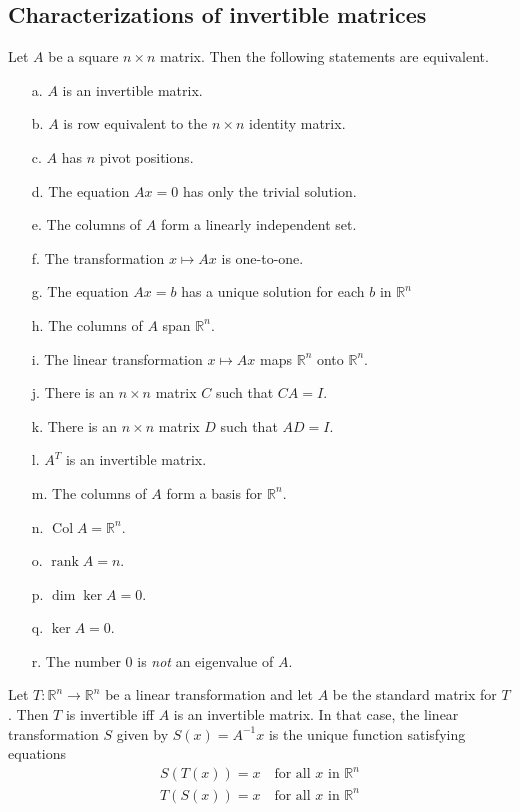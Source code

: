 \documentclass{article}
\DeclareMathOperator{\Col}{Col}
\DeclareMathOperator{\rank}{rank}
\begin{document}
\subsection{Characterizations of invertible matrices}

\begin{thm} 
    Let $A$ be a square $n\times n$ matrix. Then the following statements are equivalent.
    \begin{enumerate}
        \item[a.] $A$ is an invertible matrix.
        \item[b.] $A$ is row equivalent to the $n\times n$ identity matrix.
        \item[c.] $A$ has $n$ pivot positions.
        \item[d.] The equation $Ax=0$ has only the trivial solution.
        \item[e.] The columns of $A$ form a linearly independent set.
        \item[f.] The transformation $x \mapsto Ax$ is one-to-one.
        \item[g.] The equation $Ax=b$ has a unique solution for each $b$ in $\mathbb{R}^n$
        \item[h.] The columns of $A$ span $\mathbb{R}^n$.
        \item[i.] The linear transformation $x\mapsto Ax$ maps $\mathbb{R}^n$ onto $\mathbb{R}^n$.
        \item[j.] There is an $n\times n$ matrix $C$ such that $CA=I$.
        \item[k.] There is an $n\times n$ matrix $D$ such that $AD=I$.
        \item[l.] $A^T$ is an invertible matrix.
        \item[m.] The columns of \(A\) form a basis for \(\mathbb{R}^n\).
        \item[n.] \(\Col A=\mathbb{R}^n\).
        \item[o.] \(\rank A=n\).
        \item[p.] \(\dim \ker A=0\).
        \item[q.] \(\ker A=0\).
        \item[r.] The number \(0\) is \textit{not} an eigenvalue of \(A\).
    \end{enumerate}
\end{thm}

\begin{thm}
    Let $T:\mathbb{R}^n\to\mathbb{R}^n$ be a linear transformation and let $A$ be the standard matrix for $T$. Then $T$ is invertible iff $A$ is an invertible matrix. In that case, the linear transformation $S$ given by $S(x)=A^{-1}x$ is the unique function satisfying equations
    \begin{align}
        S(T(x))=x\quad\text{for all $x$ in $\mathbb{R}^n$}\\
        T(S(x))=x\quad\text{for all $x$ in $\mathbb{R}^n$}
    \end{align}
\end{thm}
    
\end{document}

